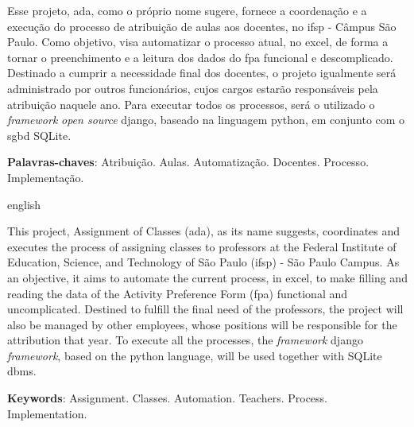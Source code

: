
\setlength{\absparsep}{18pt} %
\begin{resumo}

Esse projeto, \ac{ada}, como o próprio nome sugere, fornece a coordenação e a execução do processo de atribuição de aulas aos docentes, no \ac{ifsp} - Câmpus São Paulo. Como objetivo, visa automatizar o processo atual, no \gls{excel}, de forma a tornar o preenchimento e a leitura dos dados do \ac{fpa} funcional e descomplicado. Destinado a cumprir a necessidade final dos docentes, o projeto igualmente será administrado por outros funcionários, cujos cargos estarão responsáveis pela atribuição naquele ano. Para executar todos os processos, será o utilizado o \textit{\gls{framework}} \textit{\gls{open source}} \gls{django}, baseado na linguagem \gls{python}, em conjunto com o \ac{sgbd} SQLite.

 \textbf{Palavras-chaves}: Atribuição. Aulas. Automatização. Docentes. Processo. Implementação.
\end{resumo}

\begin{resumo}[Abstract]
 \begin{otherlanguage*}{english}

This project, Assignment of Classes (\ac{ada}), as its name suggests, coordinates and executes the process of assigning classes to professors at the Federal Institute of Education, Science, and Technology of São Paulo (\ac{ifsp}) - São Paulo Campus. As an objective, it aims to automate the current process, in \gls{excel}, to make filling and reading the data of the Activity Preference Form (\ac{fpa}) functional and uncomplicated. Destined to fulfill the final need of the professors, the project will also be managed by other employees, whose positions will be responsible for the attribution that year. To execute all the processes, the \textit{\gls{framework}} \gls{django} \textit{\gls{framework}}, based on the \gls{python} language, will be used together with SQLite \ac{dbms}.

   \vspace{\onelineskip}
   \noindent 
   
   \textbf{Keywords}: Assignment. Classes. Automation. Teachers. Process. Implementation.
 \end{otherlanguage*}
\end{resumo}